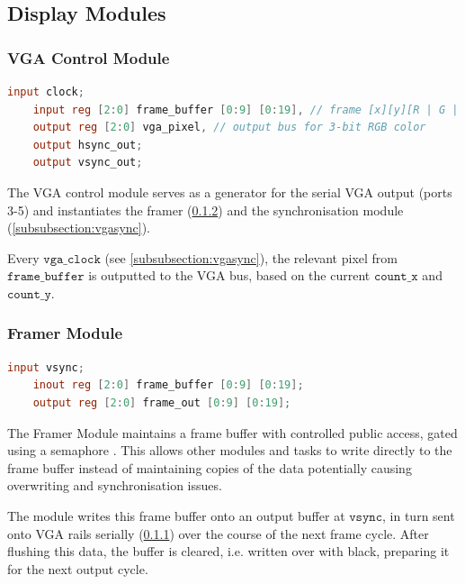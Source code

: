 \subsection{Display Modules}
\label{subsection:display}

\subsubsection{VGA Control Module}
\label{subsubsection:vgacontrol}
%
\begin{lstlisting}[language=Verilog]
    input clock;
    input reg [2:0] frame_buffer [0:9] [0:19], // frame [x][y][R | G | B]
    output reg [2:0] vga_pixel, // output bus for 3-bit RGB color
    output hsync_out;
    output vsync_out;
\end{lstlisting}

The VGA control module serves as a generator for the serial VGA output 
(ports 3-5) and instantiates the framer (\ref{subsubsection:framer}) and
the synchronisation module (\ref{subsubsection:vgasync}).

Every \(\texttt{vga\_clock}\) (see \ref{subsubsection:vgasync}), the relevant pixel from
\(\texttt{frame\_buffer}\) is outputted to the VGA bus, based on the
current \(\texttt{count\_x}\) and \(\texttt{count\_y}\).\\
 

\subsubsection{Framer Module}
\label{subsubsection:framer}
%
\begin{lstlisting}[language=Verilog]
    input vsync;
    inout reg [2:0] frame_buffer [0:9] [0:19];
    output reg [2:0] frame_out [0:9] [0:19];
\end{lstlisting}

The Framer Module maintains a frame buffer with controlled public access,
gated using a semaphore \cite{semaphore}. This allows other modules and tasks 
to write directly to the frame buffer instead of maintaining copies of the data 
potentially causing overwriting and synchronisation issues.

The module writes this frame buffer onto an output buffer at \(\texttt{vsync}\), 
in turn sent onto VGA rails serially (\ref{subsubsection:vgacontrol})
over the course of the next frame cycle. After flushing this data, the buffer is cleared,
i.e. written over with black, preparing it for the next output cycle.
\pagebreak

